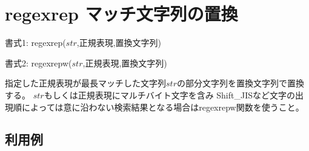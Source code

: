 
%

\section{regexrep マッチ文字列の置換\label{sect:regexrep}}

書式1: regexrep($str$,正規表現,置換文字列)

書式2: regexrepw($str$,正規表現,置換文字列)

指定した正規表現が最長マッチした文字列$str$の部分文字列を置換文字列で置換する。
$str$もしくは正規表現にマルチバイト文字を含み
Shift\_JISなど文字の出現順によっては意に沿わない検索結果となる場合はregexrepw関数を使うこと。

\subsection*{利用例}


%

